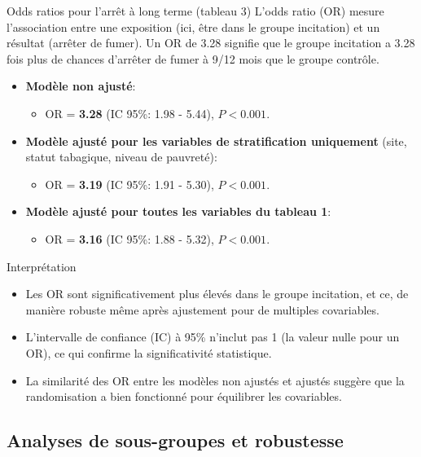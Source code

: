 \documentclass[aspectratio=169,xcolor=dvipsnames]{beamer}
\begin{document}
\begin{frame}{Odds ratios pour l'arrêt à long terme (tableau 3)}
    L'odds ratio (OR) mesure l'association entre une exposition (ici, être dans le groupe incitation) et un résultat (arrêter de fumer). Un OR de 3.28 signifie que le groupe incitation a 3.28 fois plus de chances d'arrêter de fumer à 9/12 mois que le groupe contrôle.
    \begin{itemize}
        \item \textbf{Modèle non ajusté}:
            \begin{itemize}
                \item OR = \textbf{3.28} (IC 95\%: 1.98 - 5.44), $P<0.001$.
            \end{itemize}
        \item \textbf{Modèle ajusté pour les variables de stratification uniquement} (site, statut tabagique, niveau de pauvreté):
            \begin{itemize}
                \item OR = \textbf{3.19} (IC 95\%: 1.91 - 5.30), $P<0.001$.
            \end{itemize}
        \item \textbf{Modèle ajusté pour toutes les variables du tableau 1}:
            \begin{itemize}
                \item OR = \textbf{3.16} (IC 95\%: 1.88 - 5.32), $P<0.001$.
            \end{itemize}
    \end{itemize}
    \begin{block}{Interprétation}
        \begin{itemize}
            \item Les OR sont significativement plus élevés dans le groupe incitation, et ce, de manière robuste même après ajustement pour de multiples covariables.
            \item L'intervalle de confiance (IC) à 95\% n'inclut pas 1 (la valeur nulle pour un OR), ce qui confirme la significativité statistique.
            \item La similarité des OR entre les modèles non ajustés et ajustés suggère que la randomisation a bien fonctionné pour équilibrer les covariables.
        \end{itemize}
    \end{block}
\end{frame}

\subsection{Analyses de sous-groupes et robustesse}
\end{document}

